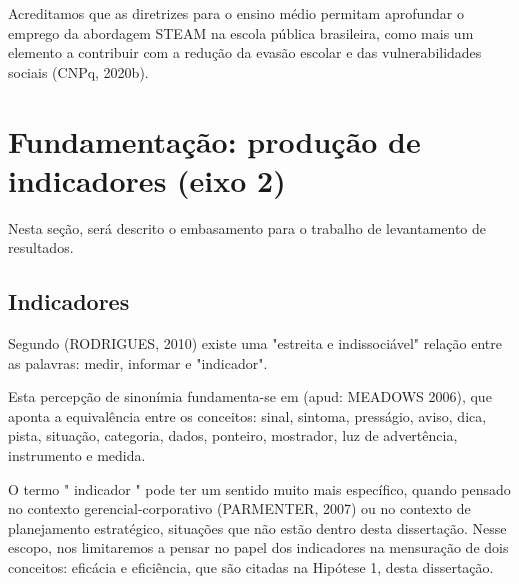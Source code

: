 \noindent\begin{center}\mbox{\centering{}}\end{center}


Acreditamos que as diretrizes para o ensino médio permitam aprofundar o emprego da abordagem STEAM na escola pública brasileira, como mais um elemento a contribuir com a redução da evasão escolar e das vulnerabilidades sociais  (CNPq, 2020b).

\section[Fundamentação: produção de indicadores (eixo 2)]{Fundamentação: produção de indicadores (eixo 2)}\label{Fundamentação: produção de indicadores (eixo 2)}
Nesta seção, será descrito o embasamento para o trabalho de levantamento de resultados.

\subsection[Indicadores]{Indicadores}\label{Indicadores}
Segundo (RODRIGUES, 2010) existe uma "estreita e indissociável" relação entre as palavras: medir, informar e "indicador".

Esta percepção de sinonímia fundamenta-se em (apud: MEADOWS 2006), que aponta a equivalência entre os conceitos: sinal, sintoma, presságio, aviso, dica, pista, situação, categoria, dados, ponteiro, mostrador, luz de advertência, instrumento e medida.

O termo " indicador " pode ter um sentido muito mais específico, quando pensado no contexto gerencial-corporativo (PARMENTER, 2007) ou no contexto de planejamento estratégico, situações que não estão dentro desta dissertação. Nesse escopo, nos limitaremos a pensar no papel dos indicadores na mensuração de dois conceitos: eficácia e eficiência, que são citadas na Hipótese 1, desta dissertação.

